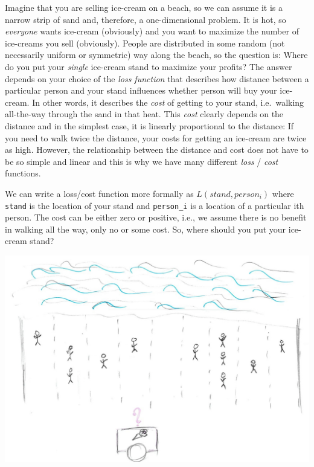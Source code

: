 \documentclass[
]{book}
\begin{document}
Imagine that you are selling ice-cream on a beach, so we can assume it is a narrow strip of sand and, therefore, a one-dimensional problem. It is hot, so \emph{everyone} wants ice-cream (obviously) and you want to maximize the number of ice-creams you sell (obviously). People are distributed in some random (not necessarily uniform or symmetric) way along the beach, so the question is: Where do you put your \emph{single} ice-cream stand to maximize your profits? The answer depends on your choice of the \emph{loss function} that describes how distance between a particular person and your stand influences whether person will buy your ice-cream. In other words, it describes the \emph{cost} of getting to your stand, i.e.~walking all-the-way through the sand in that heat. This \emph{cost} clearly depends on the distance and in the simplest case, it is linearly proportional to the distance: If you need to walk twice the distance, your costs for getting an ice-cream are twice as high. However, the relationship between the distance and cost does not have to be so simple and linear and this is why we have many different \emph{loss} / \emph{cost} functions.

We can write a loss/cost function more formally as \(L(stand, person_i)\) where \texttt{stand} is the location of your stand and \texttt{person\_i} is a location of a particular ith person. The cost can be either zero or positive, i.e., we assume there is no benefit in walking all the way, only no or some cost. So, where should you put your ice-cream stand?

\begin{center}\includegraphics[width=1\linewidth]{images/loss-functions-where-to} \end{center}
\end{document}
